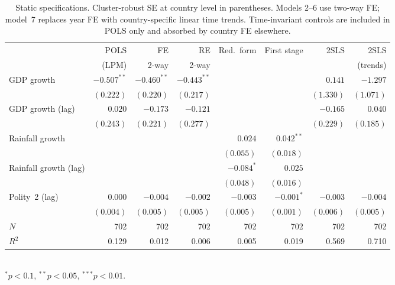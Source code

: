 \documentclass[11pt,a4paper]{article}
\begin{document}
\begin{table}[H]
\centering
\caption{Static specifications. Cluster-robust SE at country level in
parentheses. Models 2--6 use two-way FE; model~7 replaces year FE with
country-specific linear time trends. Time-invariant controls are
included in POLS only and absorbed by country FE elsewhere.}
\label{tab:main}
\small
\begin{tabular}{lrrrrrrr}
\toprule
 & POLS & FE & RE & Red.\ form & First stage & 2SLS & 2SLS \\
 & (LPM) & 2-way & 2-way & & & & (trends) \\
\midrule
GDP growth        & $-0.507^{**}$ & $-0.460^{**}$ & $-0.443^{**}$ &        &              & $0.141$       & $-1.297$ \\
                  & $(0.222)$     & $(0.220)$     & $(0.217)$     &        &              & $(1.330)$     & $(1.071)$ \\
GDP growth (lag)  & $0.020$       & $-0.173$      & $-0.121$      &        &              & $-0.165$      & $0.040$ \\
                  & $(0.243)$     & $(0.221)$     & $(0.277)$     &        &              & $(0.229)$     & $(0.185)$ \\
Rainfall growth   &               &               &               & $0.024$ & $0.042^{**}$ &              &  \\
                  &               &               &               & $(0.055)$ & $(0.018)$  &              &  \\
Rainfall growth (lag) &           &               &               & $-0.084^{*}$ & $0.025$ &              &  \\
                  &               &               &               & $(0.048)$ & $(0.016)$  &              &  \\
Polity~2 (lag)    & $0.000$       & $-0.004$      & $-0.002$      & $-0.003$ & $-0.001^{*}$ & $-0.003$    & $-0.004$ \\
                  & $(0.004)$     & $(0.005)$     & $(0.005)$     & $(0.005)$ & $(0.001)$   & $(0.006)$   & $(0.005)$ \\
\midrule
$N$               & 702 & 702 & 702 & 702 & 702 & 702 & 702 \\
$R^2$             & 0.129 & 0.012 & 0.006 & 0.005 & 0.019 & 0.569 & 0.710 \\
\bottomrule
\end{tabular}\\[2pt]
\footnotesize $^{*}p<0.1$, $^{**}p<0.05$, $^{***}p<0.01$.
\end{table}
\end{document}
